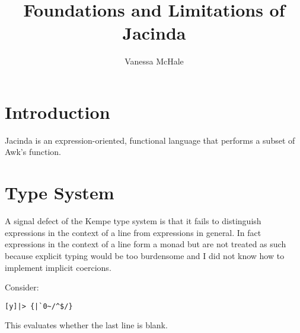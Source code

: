 \documentclass{report}
\begin{document}
\title{Foundations and Limitations of Jacinda}
\author {Vanessa McHale}
\maketitle

\tableofcontents

\section{Introduction}

Jacinda is an expression-oriented, functional language that performs a subset of Awk's function.

\section{Type System}

A signal defect of the Kempe type system is that it fails to distinguish expressions in the context of a line from expressions in general. In fact expressions in the context of a line form a monad but are not treated as such because explicit typing would be too burdensome and I did not know how to implement implicit coercions.

Consider:

\begin{verbatim}
[y]|> {|`0~/^$/}
\end{verbatim}

This evaluates whether the last line is blank.
\end{document}

